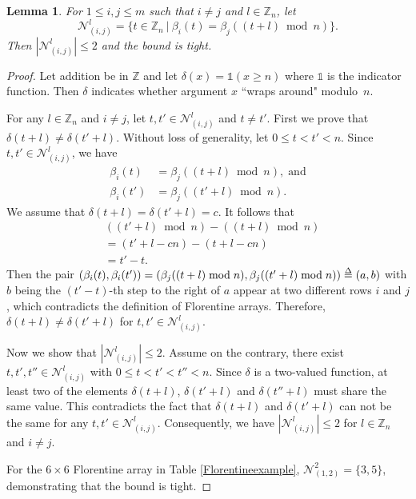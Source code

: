 \documentclass[conference,letterpaper]{IEEEtran}
\newtheorem{lemma}{Lemma}
\theoremstyle{definition}
\def\delequal{\mathrel{\ensurestackMath{\stackon[1pt]{=}{\scriptstyle\Delta}}}}
\begin{document}
\begin{lemma} \label{NumbofSolequation}
For $1 \leq {i}, {j} \leq m$ such that $i \neq j$ and $l \in \mathbb{Z}_{n}$, let
\begin{equation*} 
\mathcal{N}^l_{(i, j)}=\{t \in \mathbb{Z}_{n} ~| ~\beta_{i}(t) = \beta_{j}((t+l) \bmod n) \}.
\end{equation*} 
Then $|\mathcal{N}^l_{(i, j)}|\leq 2$ and the bound is tight.
\end{lemma} 


\begin{proof} 
Let addition be in $\mathbb{Z}$ and let $\delta(x)=\mathds{1}(x\geq n)$ where $\mathds{1}$ is the indicator function. Then $\delta$ indicates whether argument $x$
 ``wraps around" modulo~$n$. 
 
 For any $l \in \mathbb{Z}_{n}$ and ${i} \neq {j}$, let
 $ t, t' \in \mathcal{N}^l_{(i, j)} $ and $ t \neq t'$. First we prove that $\delta(t + l) \neq \delta(t' + l)$.
Without loss of generality,  let $0 \leq t < t' < n$.
Since $t, t' \in \mathcal{N}^l_{(i, j)} $, we have 
\begin{align*}
     \beta_{i}(t) &= \beta_{j}((t + l) \bmod n), \; \text{and} \\
     \beta_{i}(t') &= \beta_{j}((t' + l) \bmod n).       
\end{align*}
We assume that  $\delta(t +l) = \delta(t' +l ) = c $. It follows that
\begin{align*}
&((t' + l) \bmod n) - ((t + l) \bmod n) \\ & = (t' + l - cn) - (t + l - cn) \\ &=  t' - t. 
\end{align*}
Then the pair $(\beta_{i}(t), \beta_{i}(t') )= (\beta_{j}((t + l) \bmod n), \beta_{j}((t' + l) \bmod n)) \delequal(a, b) $ with $b$
being the $(t'-t)$-th step to the right of $a$  appear at two different rows $i$ and $j$, which contradicts the definition of  Florentine arrays. Therefore, $\delta(t + l) \neq \delta(t' + l)$ for   $ t, t' \in \mathcal{N}^l_{(i, j)}. $

Now we show that $|\mathcal{N}^l_{(i, j)}|\leq 2$.
Assume on the contrary, 
there exist $t , t',  t'' \in \mathcal{N}^l_{(i, j)}$  with
 $0 \leq t < t' < t'' < n$.  Since $\delta$ is a two-valued function, at least two of the elements $\delta(t+l)$, $\delta(t' +l)$ and $\delta(t'' +l)$ must share the same value. This contradicts the fact that  $\delta(t + l) $ and $ \delta(t' + l)$ can not be the same for  any $ t, t' \in \mathcal{N}^l_{(i, j)}.$
Consequently, we have  $|\mathcal{N}^l_{(i, j)}|\leq 2$ for $ l \in \mathbb{Z}_{n}$ and $ {i} \neq {j}$. 

For the $6 \times 6$ Florentine array in Table \ref{Florentineexample}, $\mathcal{N}^2_{(1, 2)}=\{3, 5\}$,  demonstrating that the bound is tight. \qedhere
\end{proof}
\end{document}
